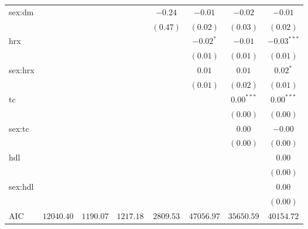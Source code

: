 \begin{tabular}{l c c c c c c c}
sex:dm               &               &               &             & $-0.24$       & $-0.01$       & $-0.02$       & $-0.01$       \\
                     &               &               &             & $(0.47)$      & $(0.02)$      & $(0.03)$      & $(0.02)$      \\
hrx                  &               &               &             &               & $-0.02^{*}$   & $-0.01$       & $-0.03^{***}$ \\
                     &               &               &             &               & $(0.01)$      & $(0.01)$      & $(0.01)$      \\
sex:hrx              &               &               &             &               & $0.01$        & $0.01$        & $0.02^{*}$    \\
                     &               &               &             &               & $(0.01)$      & $(0.02)$      & $(0.01)$      \\
tc                   &               &               &             &               &               & $0.00^{***}$  & $0.00^{***}$  \\
                     &               &               &             &               &               & $(0.00)$      & $(0.00)$      \\
sex:tc               &               &               &             &               &               & $0.00$        & $-0.00$       \\
                     &               &               &             &               &               & $(0.00)$      & $(0.00)$      \\
hdl                  &               &               &             &               &               &               & $0.00$        \\
                     &               &               &             &               &               &               & $(0.00)$      \\
sex:hdl              &               &               &             &               &               &               & $0.00$        \\
                     &               &               &             &               &               &               & $(0.00)$      \\
\midrule
AIC                  & $12040.40$    & $1190.07$     & $1217.18$   & $2809.53$     & $47056.97$    & $35650.59$    & $40154.72$    \\

\end{tabular}
